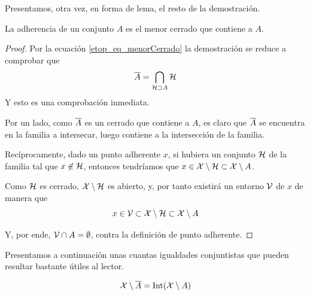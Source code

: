 Presentamos, otra vez, en forma de lema, el resto de la demostración.
\begin{lem}
	\label{etop_lem_caracterizacionAdherencia}
	La adherencia de un conjunto $A$ es el menor cerrado que contiene a $A$.
\end{lem}
\begin{proof}
	Por la ecuación \eqref{etop_eq_menorCerrado} la demostración se reduce a comprobar que
	\begin{equation*}
	\overline{A}=\bigcap_{\mathcal{H}\supset A}\mathcal{H}
	\end{equation*}
	Y esto es una comprobación inmediata.
	
	Por un lado, como $\overline{A}$ es un cerrado que contiene a $A$, es claro que $\overline{A}$ se encuentra en la familia a intersecar, luego contiene a la intersección de la familia.
	
	Recíprocamente, dado un punto adherente $x$, si hubiera un conjunto $\mathcal{H}$ de la familia tal que $x\not\in \mathcal{H}$, entonces tendríamos que $x\in\mathcal{X}\setminus\mathcal{H}\subset\mathcal{X}\setminus A$.
	
	Como $\mathcal{H}$ es cerrado, $\mathcal{X}\setminus\mathcal{H}$ es abierto, y, por tanto existirá un entorno $\mathcal{V}$ de $x$ de manera que \begin{equation*}
	x\in\mathcal{V}\subset\mathcal{X}\setminus\mathcal{H}\subset\mathcal{X}\setminus A
	\end{equation*}
	
	Y, por ende, $\mathcal{V}\cap A=\emptyset$, contra la definición de punto adherente.
\end{proof}
Presentamos a continuación unas cuantas igualdades conjuntistas que pueden resultar bastante útiles al lector.
\begin{prop}
	\label{etop_prop_compAdher}
	\begin{equation*}
	\mathcal{X}\setminus\overline{A}=\operatorname{\mathrm{Int}}(\mathcal{X}\setminus A)
	\end{equation*}
\end{prop}
